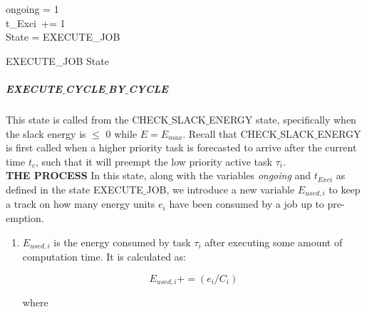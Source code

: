 \documentclass[12pt,hidelinks]{article}
\begin{document}
{\begin{enumerate}
\end{enumerate}

\begin{algorithm}[H]
\DontPrintSemicolon
  
   ongoing = 1 \\
   t_{Exci}\  += 1 \\
   {State = EXECUTE\_JOB}
   
\caption{EXECUTE\_JOB State}
\end{algorithm}

\subparagraph{EXECUTE$\_$CYCLE$\_$BY$\_$CYCLE}\hfill
\newline

This state is called from the CHECK$\_$SLACK$\_$ENERGY state, specifically when the slack energy is $\leq$ 0 while $E=E_{max}$. Recall that CHECK$\_$SLACK$\_$ENERGY is first called when a higher priority task is forecasted to arrive after the current time \textit{$t_c$}, such that it will preempt the low priority active task $\tau_i$.\\

\textbf{THE PROCESS}
\newline
In this state, along with the variables \textit{ongoing} and \textit{$t_{Exci}$} as defined in the state EXECUTE$\_$JOB, we introduce a new variable \textit{$E_{used,i}$} to keep a track on how many energy units \textit{$e_i$} have been consumed by a job up to pre-emption.

\begin{enumerate}
    \item  $E_{used,i}$ is the energy consumed by task $\tau_i$ after executing some amount of computation time. It is calculated as: 
    
    \begin{equation}
            E_{used,i} += (e_i / C_i) 
        \end{equation}
        
        where
        

\end{enumerate}}
\end{document}
